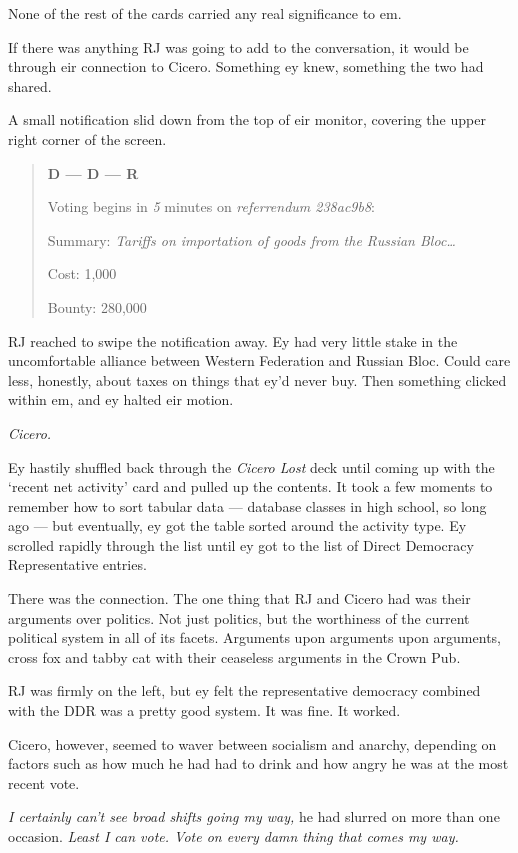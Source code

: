 None of the rest of the cards carried any real significance to em.

If there was anything RJ was going to add to the conversation, it would be through eir connection to Cicero. Something ey knew, something the two had shared.

A small notification slid down from the top of eir monitor, covering the upper right corner of the screen.

\begin{quote}
\textbf{D --- D --- R}

Voting begins in \emph{5} minutes on \emph{referrendum 238ac9b8}:

Summary: \emph{Tariffs on importation of goods from the Russian Bloc\ldots{}}

Cost: 1,000

Bounty: 280,000
\end{quote}

RJ reached to swipe the notification away. Ey had very little stake in the uncomfortable alliance between Western Federation and Russian Bloc. Could care less, honestly, about taxes on things that ey'd never buy. Then something clicked within em, and ey halted eir motion.

\emph{Cicero.}

Ey hastily shuffled back through the \emph{Cicero Lost} deck until coming up with the `recent net activity' card and pulled up the contents. It took a few moments to remember how to sort tabular data --- database classes in high school, so long ago --- but eventually, ey got the table sorted around the activity type. Ey scrolled rapidly through the list until ey got to the list of Direct Democracy Representative entries.

There was the connection. The one thing that RJ and Cicero had was their arguments over politics. Not just politics, but the worthiness of the current political system in all of its facets. Arguments upon arguments upon arguments, cross fox and tabby cat with their ceaseless arguments in the Crown Pub.

RJ was firmly on the left, but ey felt the representative democracy combined with the DDR was a pretty good system. It was fine. It worked.

Cicero, however, seemed to waver between socialism and anarchy, depending on factors such as how much he had had to drink and how angry he was at the most recent vote.

\emph{I certainly can't see broad shifts going my way,} he had slurred on more than one occasion. \emph{Least I can vote. Vote on every damn thing that comes my way.}


